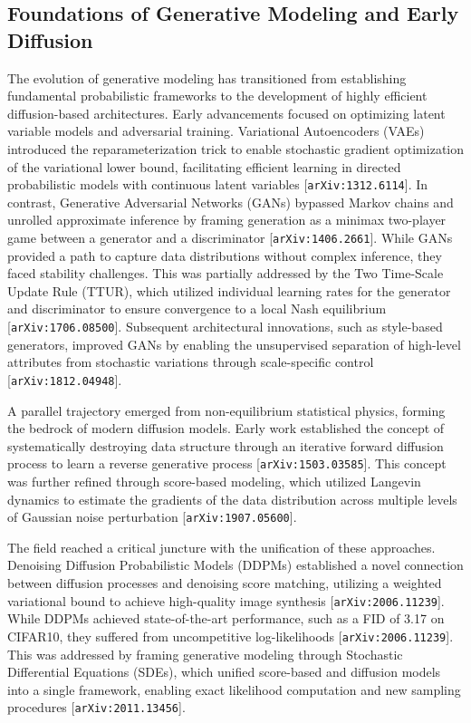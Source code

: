 \documentclass[11pt]{article}
\begin{document}
\subsection{Foundations of Generative Modeling and Early Diffusion}

The evolution of generative modeling has transitioned from establishing fundamental probabilistic frameworks to the development of highly efficient diffusion-based architectures. Early advancements focused on optimizing latent variable models and adversarial training. Variational Autoencoders (VAEs) introduced the reparameterization trick to enable stochastic gradient optimization of the variational lower bound, facilitating efficient learning in directed probabilistic models with continuous latent variables [\texttt{arXiv:1312.6114}]. In contrast, Generative Adversarial Networks (GANs) bypassed Markov chains and unrolled approximate inference by framing generation as a minimax two-player game between a generator and a discriminator [\texttt{arXiv:1406.2661}]. While GANs provided a path to capture data distributions without complex inference, they faced stability challenges. This was partially addressed by the Two Time-Scale Update Rule (TTUR), which utilized individual learning rates for the generator and discriminator to ensure convergence to a local Nash equilibrium [\texttt{arXiv:1706.08500}]. Subsequent architectural innovations, such as style-based generators, improved GANs by enabling the unsupervised separation of high-level attributes from stochastic variations through scale-specific control [\texttt{arXiv:1812.04948}].

A parallel trajectory emerged from non-equilibrium statistical physics, forming the bedrock of modern diffusion models. Early work established the concept of systematically destroying data structure through an iterative forward diffusion process to learn a reverse generative process [\texttt{arXiv:1503.03585}]. This concept was further refined through score-based modeling, which utilized Langevin dynamics to estimate the gradients of the data distribution across multiple levels of Gaussian noise perturbation [\texttt{arXiv:1907.05600}].

The field reached a critical juncture with the unification of these approaches. Denoising Diffusion Probabilistic Models (DDPMs) established a novel connection between diffusion processes and denoising score matching, utilizing a weighted variational bound to achieve high-quality image synthesis [\texttt{arXiv:2006.11239}]. While DDPMs achieved state-of-the-art performance, such as a FID of 3.17 on CIFAR10, they suffered from uncompetitive log-likelihoods [\texttt{arXiv:2006.11239}]. This was addressed by framing generative modeling through Stochastic Differential Equations (SDEs), which unified score-based and diffusion models into a single framework, enabling exact likelihood computation and new sampling procedures [\texttt{arXiv:2011.13456}].
\end{document}
